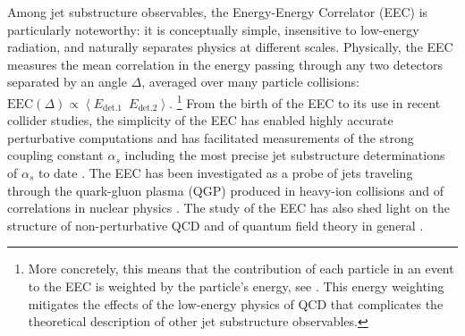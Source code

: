 Among jet substructure observables, the Energy-Energy Correlator (EEC) \cite{Basham:1978bw,Basham:1978zq,Basham:1979gh} is particularly noteworthy:
%
it is conceptually simple, insensitive to low-energy radiation, and naturally separates physics at different scales.
%
Physically, the EEC measures the mean correlation in the energy passing through any two detectors separated by an angle \(\Delta\), averaged over many particle collisions:
%
\(
    \text{EEC}(\Delta)
    \propto
    \left\langle
        E_\text{det.\.1} \,\,\, E_\text{det.\.2}
    \right\rangle
\).%
\footnote{
    More concretely, this means that the contribution of each particle in an event to the EEC is weighted by the particle's energy,
    see .
    This energy weighting mitigates the effects of the low-energy physics of QCD that complicates the theoretical description of other jet substructure observables.
}
%
From the birth of the EEC to its use in recent collider studies, the simplicity of the EEC has enabled highly accurate perturbative computations \cite{Clay:1995sd,Glover:1994vz,Kramer:1996qr,DelDuca:2016csb,Gituliar:2017umx,Dixon:2018tpg,Dixon:2018qgp,Henn:2019gkr,Luo:2019nig,Gao:2020vyx,Neill:2022lqx,Lee:2023npz,Kramer:1995qh,deFlorian:2004mp,Banfi:2002vw,Tulipant:2017ybb,Moult:2018jzp,Korchemsky:2019nzm,Dixon:2019uzg,Gao:2019ojf,Luo:2019hmp,Luo:2019bmw,Moult:2019vou,Li:2020bub,Ebert:2020sfi,Li:2021txc,Duhr:2022yyp,Chen:2023zlx,Gao:2023ivm} and has facilitated measurements of the strong coupling constant \(\alpha_s\) \cite{Martin:1986uq,DELPHI:1990sof,SLD:1994yoe,ATLAS:2015yaa,ATLAS:2017qir,dEnterria:2018cye,Kardos:2018kqj,Ali:2020ksn,dEnterria:2022hzv,ATLAS:2023tgo} including the most precise jet substructure determinations of \(\alpha_s\) to date \cite{CMS:2024mlf}.
%
The EEC has been investigated as a probe of jets traveling through the quark-gluon plasma (QGP) produced in heavy-ion collisions \cite{Lokhtin:2004tx,Lokhtin:2006dp,Andres:2022ovj,Barata:2023zqg,Andres:2023xwr,Yang:2023dwc,Barata:2023vnl,Barata:2023bhh,Barata:2024nqo} and of correlations in nuclear physics \cite{Karapetyan:2019fst,Liu:2022wop,Liu:2023aqb,Kang:2023gvg,Cao:2023oef}.
%
The study of the EEC has also shed light on the structure of non-perturbative QCD \cite{Nason:1995np,Korchemsky:1997sy,Korchemsky:1999kt,Dokshitzer:1999sh,Chen:2020vvp,Jaarsma:2023ell,Schindler:2023cww,Lee:2024esz}
and of quantum field theory in general \cite{Richards:1983sr,Sveshnikov:1995vi,Hofman:2008ar,Hatta:2012kn,Belitsky:2013bja,Belitsky:2013ofa,Belitsky:2013xxa,Belitsky:2014zha,Korchemsky:2015ssa,Goncalves:2014ffa,Farnsworth:2015hum,Hofman:2016awc,Kravchuk:2018htv,Kologlu:2019mfz,Chang:2020qpj,Korchemsky:2021htm,Caron-Huot:2022eqs,Chen:2023wah,Chicherin:2023gxt,Chicherin:2024ifn}.
